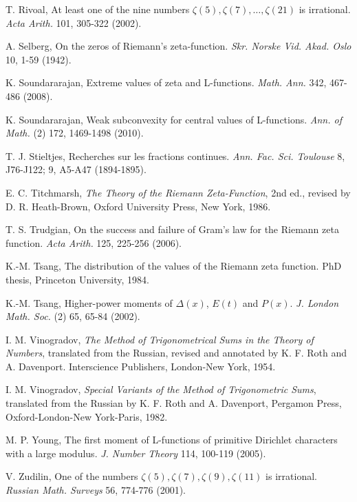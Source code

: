 \documentclass[11pt]{article}
\begin{document}
\begin{thebibliography}{99}
 T. Rivoal, At least one of the nine numbers $\zeta(5), \zeta(7), \ldots, \zeta(21)$ is irrational. \textit{Acta Arith.} 101, 305-322 (2002).

 A. Selberg, On the zeros of Riemann's zeta-function. \textit{Skr. Norske Vid. Akad. Oslo} 10, 1-59 (1942).

 K. Soundararajan, Extreme values of zeta and L-functions. \textit{Math. Ann.} 342, 467-486 (2008).

 K. Soundararajan, Weak subconvexity for central values of L-functions. \textit{Ann. of Math.} (2) 172, 1469-1498 (2010).

 T. J. Stieltjes, Recherches sur les fractions continues. \textit{Ann. Fac. Sci. Toulouse} 8, J76-J122; 9, A5-A47 (1894-1895).

 E. C. Titchmarsh, \textit{The Theory of the Riemann Zeta-Function}, 2nd ed., revised by D. R. Heath-Brown, Oxford University Press, New York, 1986.

 T. S. Trudgian, On the success and failure of Gram's law for the Riemann zeta function. \textit{Acta Arith.} 125, 225-256 (2006).

 K.-M. Tsang, The distribution of the values of the Riemann zeta function. PhD thesis, Princeton University, 1984.

 K.-M. Tsang, Higher-power moments of $\Delta(x)$, $E(t)$ and $P(x)$. \textit{J. London Math. Soc.} (2) 65, 65-84 (2002).

 I. M. Vinogradov, \textit{The Method of Trigonometrical Sums in the Theory of Numbers}, translated from the Russian, revised and annotated by K. F. Roth and A. Davenport. Interscience Publishers, London-New York, 1954.

 I. M. Vinogradov, \textit{Special Variants of the Method of Trigonometric Sums}, translated from the Russian by K. F. Roth and A. Davenport, Pergamon Press, Oxford-London-New York-Paris, 1982.

 M. P. Young, The first moment of L-functions of primitive Dirichlet characters with a large modulus. \textit{J. Number Theory} 114, 100-119 (2005).

 V. Zudilin, One of the numbers $\zeta(5), \zeta(7), \zeta(9), \zeta(11)$ is irrational. \textit{Russian Math. Surveys} 56, 774-776 (2001).

\end{thebibliography}
\end{document}
